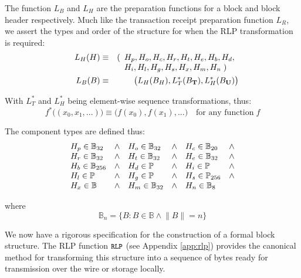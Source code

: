 \documentclass[9pt,oneside]{amsart}
\begin{document}
\begin{multicols}{2}
The function $L_B$ and $L_H$ are the preparation functions for a block and block header respectively. Much like the transaction receipt preparation function $L_R$, we assert the types and order of the structure for when the RLP transformation is required:
\begin{eqnarray}
\quad L_H(H) & \equiv & (\begin{array}[t]{l}H_p, H_o, H_c, H_r, H_t, H_e, H_b, H_d,\\ H_i, H_l, H_g, H_s, H_x, H_m, H_n \; )\end{array} \\
\quad L_B(B) & \equiv & \big( L_H(B_H), L_T^*(B_\mathbf{T}), L_H^*(B_\mathbf{U}) \big)
\end{eqnarray}

With $L_T^*$ and $L_H^*$ being element-wise sequence transformations, thus:
\begin{equation}
f^*\big( (x_0, x_1, ...) \big) \equiv \big( f(x_0), f(x_1), ... \big) \quad \text{for any function} \; f
\end{equation}

The component types are defined thus:
\begin{equation}
\begin{array}[t]{lclclcl}
H_p \in \mathbb{B}_{32} & \wedge & H_o \in \mathbb{B}_{32} & \wedge & H_c \in \mathbb{B}_{20} & \wedge \\
H_r \in \mathbb{B}_{32} & \wedge & H_t \in \mathbb{B}_{32} & \wedge & H_e \in \mathbb{B}_{32} & \wedge \\
H_b \in \mathbb{B}_{256} & \wedge & H_d \in \mathbb{P} & \wedge & H_i \in \mathbb{P} & \wedge \\
H_l \in \mathbb{P} & \wedge & H_g \in \mathbb{P} & \wedge & H_s \in \mathbb{P}_{256} & \wedge \\
H_x \in \mathbb{B} & \wedge & H_m \in \mathbb{B}_{32} & \wedge & H_n \in \mathbb{B}_{8}
\end{array}
\end{equation}

where
\begin{equation}
\mathbb{B}_n = \{ B: B \in \mathbb{B} \wedge \lVert B \rVert = n \}
\end{equation}

We now have a rigorous specification for the construction of a formal block structure. The RLP function $\texttt{\small RLP}$ (see Appendix \ref{app:rlp}) provides the canonical method for transforming this structure into a sequence of bytes ready for transmission over the wire or storage locally.


\end{multicols}
\end{document}

